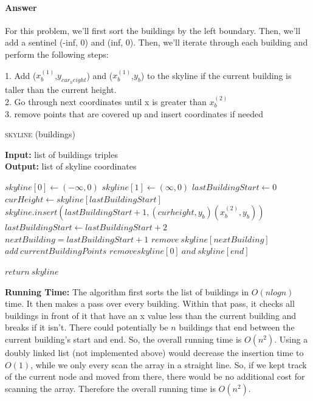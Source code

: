 \documentclass{article}
\begin{document}
\paragraph{Answer}

For this problem, we'll first sort the buildings by the left boundary. Then, we'll add a sentinel (-inf, 0) and (inf, 0). Then, we'll iterate through each building and perform the following steps:

1. Add ($x_b^{(1)}$,$y_{cur_height}$) and ($x_b^{(1)}$,$y_b$) to the skyline if the current building is taller than the current height.\\
2. Go through next coordinates until x is greater than $x_b^{(2)}$\\
3. remove points that are covered up and insert coordinates if needed

\begin{algorithm} \caption{\textsc{skyline} (buildings)}\label{alg:seb}
    {\bf Input:} list of buildings triples\\
    {\bf Output:} list of skyline coordinates
    \begin{algorithmic}[1]
        \State$skyline[0] \gets (-\infty, 0)$
        \State$skyline[1] \gets (\infty, 0)$
        \State$lastBuildingStart \gets 0$
            \State$curHeight \gets skyline[lastBuildingStart]$
                \State$skyline.insert(lastBuildingStart+1, (curheight, y_b) (x_b^{(2)}, y_b))$
                \State$lastBuildingStart \gets lastBuildingStart + 2$
            \EndIf{}
            \State$nextBuilding = lastBuildingStart + 1$
                    \State$remove\ skyline[nextBuilding]$
                    \State$add\ currentBuildingPoints$
                \EndIf{}
            \EndWhile{}
        \EndFor{}
        \State$remove skyline[0]\ and\ skyline[end]$

        \State$return\ skyline$
    \end{algorithmic}
\end{algorithm}

{\bf Running Time:} The algorithm first sorts the list of buildings in $O(nlogn)$ time. It then makes a pass over every building. Within that pass, it checks all buildings in front of it that have an x value less than the current building and breaks if it isn't. There could potentially be $n$ buildings that end between the current building's start and end. So, the overall running time is $O(n^2)$. Using a doubly linked list (not implemented above) would decrease the insertion time to $O(1)$, while we only every scan the array in a straight line. So, if we kept track of the current node and moved from there, there would be no additional cost for scanning the array. Therefore the overall running time is $O(n^2)$.
\end{document}

